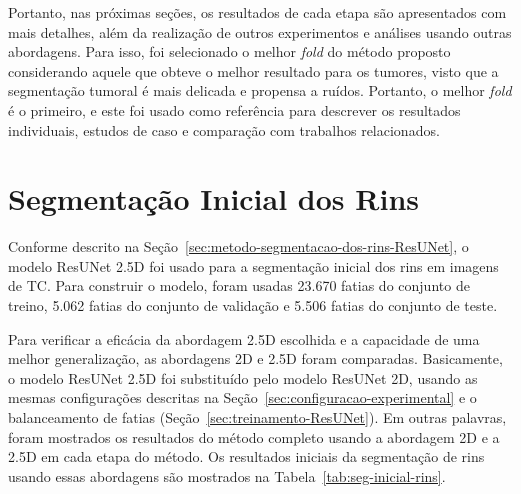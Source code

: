 Portanto, nas próximas seções, os resultados de cada etapa são apresentados com mais detalhes, além da realização de outros experimentos e análises usando outras abordagens. Para isso, foi selecionado o melhor \textit{fold} do método proposto considerando aquele que obteve o melhor resultado para os tumores, visto que a segmentação tumoral é mais delicada e propensa a ruídos. Portanto, o melhor \textit{fold} é o primeiro, e este foi usado como referência para descrever os resultados individuais, estudos de caso e comparação com trabalhos relacionados.

\section{Segmentação Inicial dos Rins}
\label{sec:segmentacao-inicial-rins}

Conforme descrito na Seção~\ref{sec:metodo-segmentacao-dos-rins-ResUNet}, o modelo ResUNet 2.5D foi usado para a segmentação inicial dos rins em imagens de TC. Para construir o modelo, foram usadas 23.670 fatias do conjunto de treino, 5.062 fatias do conjunto de validação e 5.506 fatias do conjunto de teste.

Para verificar a eficácia da abordagem 2.5D escolhida e a capacidade de uma melhor generalização, as abordagens 2D e 2.5D foram comparadas. Basicamente, o modelo ResUNet 2.5D foi substituído pelo modelo ResUNet 2D, usando as mesmas configurações descritas na Seção~\ref{sec:configuracao-experimental} e o balanceamento de fatias (Seção~\ref{sec:treinamento-ResUNet}). Em outras palavras, foram mostrados os resultados do método completo usando a abordagem 2D e a 2.5D em cada etapa do método. Os resultados iniciais da segmentação de rins usando essas abordagens são mostrados na Tabela~\ref{tab:seg-inicial-rins}.

\begin{table}[!ht]
\caption{Resultados da etapa de segmentação inicial dos rins.}
\label{tab:seg-inicial-rins}
\centering
{}
\end{table}


